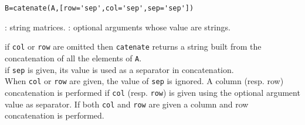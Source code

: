 
\begin{mandesc}
\end{mandesc}

\begin{calling_sequence}
\begin{verbatim}
B=catenate(A,[row='sep',col='sep',sep='sep'])
\end{verbatim}
\end{calling_sequence}
\begin{parameters}
  \begin{varlist}
    : string matrices.
    : optional arguments whose value are strings.
  \end{varlist}
\end{parameters}

\begin{mandescription} 
  if \verb+col+ or \verb+row+ are omitted then \verb+catenate+
  returns a string built from the concatenation of all the 
  elements of \verb+A+. \\
  if \verb+sep+ is given, its value 
  is used as a separator in concatenation. \\
  When \verb+col+ or \verb+row+  are given, the value of \verb+sep+
  is ignored. A column (resp. row) concatenation is 
  performed if \verb+col+ (resp. \verb+row+) is given using the optional
  argument value as separator. If both \verb+col+ and \verb+row+ 
  are given a column and row concatenation is performed. 
\end{mandescription}
  
\begin{examples}
  \begin{program}
  \end{program}
\end{examples}

